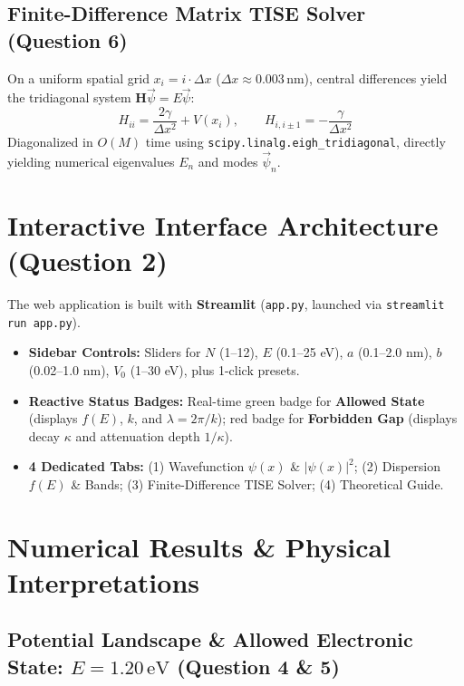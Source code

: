 \documentclass[10pt, a4paper]{article}
\begin{document}
\subsection{Finite-Difference Matrix TISE Solver (Question 6)}
On a uniform spatial grid $x_i = i\cdot\Delta x$ ($\Delta x \approx 0.003\,\text{nm}$), central differences yield the tridiagonal system $\mathbf{H}\vec{\psi} = E\vec{\psi}$:
\begin{equation}
H_{ii} = \frac{2\gamma}{\Delta x^2} + V(x_i), \qquad H_{i, i\pm 1} = -\frac{\gamma}{\Delta x^2}
\label{eq:hamiltonian}
\end{equation}
Diagonalized in $O(M)$ time using \texttt{scipy.linalg.eigh\_tridiagonal}, directly yielding numerical eigenvalues $E_n$ and modes $\vec{\psi}_n$.

\section{Interactive Interface Architecture (Question 2)}

The web application is built with \textbf{Streamlit} (\texttt{app.py}, launched via \texttt{streamlit run app.py}).
\begin{itemize}\setlength{\itemsep}{0pt}\setlength{\parskip}{1pt}
    \item \textbf{Sidebar Controls:} Sliders for $N$ (1--12), $E$ (0.1--25 eV), $a$ (0.1--2.0 nm), $b$ (0.02--1.0 nm), $V_0$ (1--30 eV), plus 1-click presets.
    \item \textbf{Reactive Status Badges:} Real-time green badge for \textbf{Allowed State} (displays $f(E)$, $k$, and $\lambda = 2\pi/k$); red badge for \textbf{Forbidden Gap} (displays decay $\kappa$ and attenuation depth $1/\kappa$).
    \item \textbf{4 Dedicated Tabs:} (1) Wavefunction $\psi(x)$ \& $|\psi(x)|^2$; (2) Dispersion $f(E)$ \& Bands; (3) Finite-Difference TISE Solver; (4) Theoretical Guide.
\end{itemize}

\section{Numerical Results \& Physical Interpretations}

\subsection{Potential Landscape \& Allowed Electronic State: \texorpdfstring{$E = 1.20\,\text{eV}$}{E = 1.20 eV} (Question 4 \& 5)}
\end{document}
